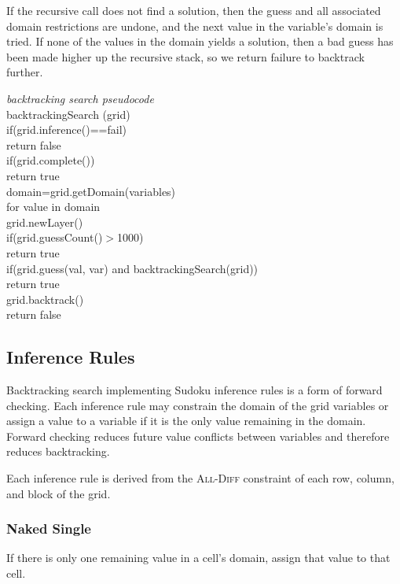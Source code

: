\documentclass{article}
\begin{document}
If the recursive call does not find a solution, then the guess and all associated domain restrictions are undone, and the next value in the variable's domain is tried. If none of the values in the domain yields a solution, then a bad guess has been made higher up the recursive stack, so we return failure to backtrack further.

\noindent\makebox[\linewidth]{\rule{\columnwidth}{0.4pt}}
\emph{backtracking search pseudocode}\\
backtrackingSearch (grid)\\
\indent if(grid.inference()==fail)\\
\indent \indent return false\\
\indent if(grid.complete())\\
\indent \indent return true\\
\indent domain=grid.getDomain(variables)\\
\indent for value in domain\\
\indent \indent grid.newLayer()\\
\indent \indent if(grid.guessCount()$>$1000)\\
\indent \indent \indent return true\\
\indent \indent if(grid.guess(val, var) and backtrackingSearch(grid))\\
\indent \indent \indent return true\\
\indent \indent grid.backtrack()\\
\indent return false\\
\noindent\makebox[\linewidth]{\rule{\columnwidth}{0.4pt}}
\subsection{Inference Rules}
Backtracking search implementing Sudoku inference rules is a form of forward checking. Each inference rule may constrain the domain of the grid variables or assign a value to a variable if it is the only value remaining in the domain. Forward checking reduces future value conflicts between variables and therefore reduces backtracking. 

Each inference rule is derived from the \textsc{All-Diff} constraint of each row, column, and block of the grid.
\subsubsection{Naked Single}
If there is only one remaining value in a cell's domain, assign that value to that cell. 
\end{document}
